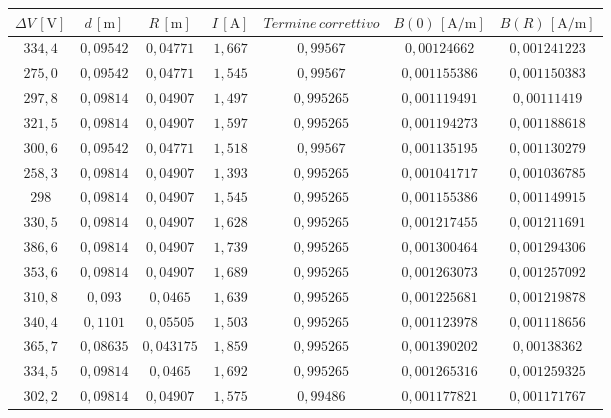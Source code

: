 \documentclass[]{article}
\begin{document}
    \begin{table}[H]
        \centering

    \begin{tabular}{||c|c|c|c|c|c|c||}
        \hline
        $\Delta V\, [\text{V}] $ & $d\, [\text{m}] $ & $R\, [\text{m}] $ & $I\, [\text{A}] $ & $Termine \, correttivo $ & $B(0)\, [\text{A/m}] $ & $B(R)\, [\text{A/m}] $\\
        \hline\hline


 
        $334,4$ & $0,09542$ & $0,04771 $ & $1,667$ & $0,99567 $ & $0,00124662 $ & $0,001241223$ \\\hline
        $275,0$ & $0,09542$ & $0,04771 $ & $1,545$ & $0,99567 $ & $0,001155386$ & $0,001150383$ \\\hline
        $297,8$ & $0,09814$ & $0,04907 $ & $1,497$ & $0,995265$ & $0,001119491$ & $0,00111419 $ \\\hline
        $321,5$ & $0,09814$ & $0,04907 $ & $1,597$ & $0,995265$ & $0,001194273$ & $0,001188618$ \\\hline
        $300,6$ & $0,09542$ & $0,04771 $ & $1,518$ & $0,99567 $ & $0,001135195$ & $0,001130279$ \\\hline
        $258,3$ & $0,09814$ & $0,04907 $ & $1,393$ & $0,995265$ & $0,001041717$ & $0,001036785$ \\\hline
        $298  $ & $0,09814$ & $0,04907 $ & $1,545$ & $0,995265$ & $0,001155386$ & $0,001149915$ \\\hline
        $330,5$ & $0,09814$ & $0,04907 $ & $1,628$ & $0,995265$ & $0,001217455$ & $0,001211691$ \\\hline
        $386,6$ & $0,09814$ & $0,04907 $ & $1,739$ & $0,995265$ & $0,001300464$ & $0,001294306$ \\\hline
        $353,6$ & $0,09814$ & $0,04907 $ & $1,689$ & $0,995265$ & $0,001263073$ & $0,001257092$ \\\hline
        $310,8$ & $0,093  $ & $0,0465  $ & $1,639$ & $0,995265$ & $0,001225681$ & $0,001219878$ \\\hline
        $340,4$ & $0,1101 $ & $0,05505 $ & $1,503$ & $0,995265$ & $0,001123978$ & $0,001118656$ \\\hline
        $365,7$ & $0,08635$ & $0,043175$ & $1,859$ & $0,995265$ & $0,001390202$ & $0,00138362 $ \\\hline
        $334,5$ & $0,09814$ & $0,0465  $ & $1,692$ & $0,995265$ & $0,001265316$ & $0,001259325$ \\\hline
        $302,2$ & $0,09814$ & $0,04907 $ & $1,575$ & $0,99486 $ & $0,001177821$ & $0,001171767$ \\\hline

\end{tabular}
\end{table}
\end{document}
